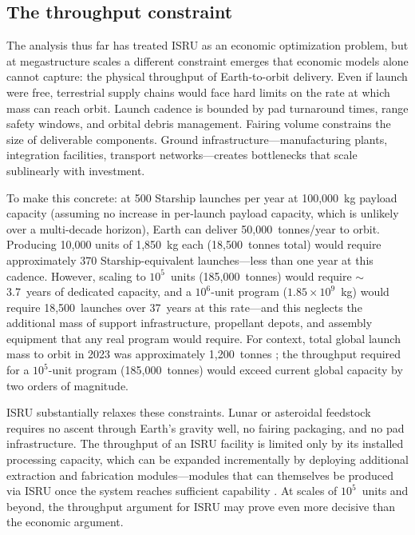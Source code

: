 \documentclass[preprint,12pt]{elsarticle}
\begin{document}
\subsection{The throughput constraint}
\label{sec:throughput}

The analysis thus far has treated ISRU as an economic optimization problem, but at megastructure scales a different constraint emerges that economic models alone cannot capture: the physical throughput of Earth-to-orbit delivery. Even if launch were free, terrestrial supply chains would face hard limits on the rate at which mass can reach orbit. Launch cadence is bounded by pad turnaround times, range safety windows, and orbital debris management. Fairing volume constrains the size of deliverable components. Ground infrastructure---manufacturing plants, integration facilities, transport networks---creates bottlenecks that scale sublinearly with investment.

To make this concrete: at 500 Starship launches per year at 100{,}000~kg payload capacity (assuming no increase in per-launch payload capacity, which is unlikely over a multi-decade horizon), Earth can deliver 50{,}000~tonnes/year to orbit. Producing 10{,}000 units of 1{,}850~kg each (18{,}500~tonnes total) would require approximately 370 Starship-equivalent launches---less than one year at this cadence. However, scaling to $10^5$~units (185{,}000~tonnes) would require $\sim$3.7~years of dedicated capacity, and a $10^6$-unit program ($1.85 \times 10^9$~kg) would require 18{,}500~launches over 37~years at this rate---and this neglects the additional mass of support infrastructure, propellant depots, and assembly equipment that any real program would require. For context, total global launch mass to orbit in 2023 was approximately 1{,}200~tonnes \cite{jones2022}; the throughput required for a $10^5$-unit program (185{,}000~tonnes) would exceed current global capacity by two orders of magnitude.

ISRU substantially relaxes these constraints. Lunar or asteroidal feedstock requires no ascent through Earth's gravity well, no fairing packaging, and no pad infrastructure. The throughput of an ISRU facility is limited only by its installed processing capacity, which can be expanded incrementally by deploying additional extraction and fabrication modules---modules that can themselves be produced via ISRU once the system reaches sufficient capability \cite{metzger2013}. At scales of $10^5$~units and beyond, the throughput argument for ISRU may prove even more decisive than the economic argument.
\end{document}
